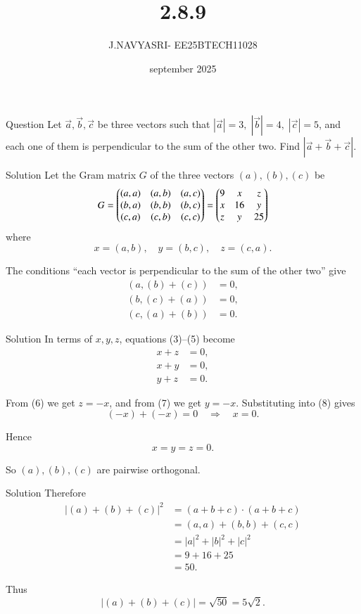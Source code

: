 \documentclass{beamer}
\title %
{2.8.9}
\date{september 2025}
\author %
{J.NAVYASRI- EE25BTECH11028}
\begin{document}
\frame{\titlepage}
\begin{frame}{Question}
Let $\vec{a}, \vec{b}, \vec{c}$ be three vectors such that 
$|\vec{a}|=3,\; |\vec{b}|=4,\; |\vec{c}|=5$, and each one of them is perpendicular to the sum of the other two. 
Find $|\vec{a}+\vec{b}+\vec{c}|$.
\end{frame}
\bigski
\begin{frame}{Solution}
Let the Gram matrix $G$ of the three vectors $(a), (b), (c)$ be
\begin{equation}
G = 
\begin{pmatrix}
(a,a) & (a,b) & (a,c) \\
(b,a) & (b,b) & (b,c) \\
(c,a) & (c,b) & (c,c)
\end{pmatrix}
=
\begin{pmatrix}
9 & x & z \\
x & 16 & y \\
z & y & 25
\end{pmatrix}
\end{equation}
where
\begin{equation}
x = (a,b), \quad y = (b,c), \quad z = (c,a).
\end{equation}

The conditions ``each vector is perpendicular to the sum of the other two'' give
\begin{align}
(a,(b)+(c)) &= 0, \\
(b,(c)+(a)) &= 0, \\
(c,(a)+(b)) &= 0.
\end{align}
\end{frame}

\begin{frame}{Solution}
In terms of $x,y,z$, equations (3)--(5) become
\begin{align}
x+z &= 0, \\
x+y &= 0, \\
y+z &= 0.
\end{align}

From (6) we get $z=-x$, and from (7) we get $y=-x$. Substituting into (8) gives
\begin{equation}
(-x)+(-x) = 0 \quad \Rightarrow \quad x=0.
\end{equation}

Hence
\begin{equation}
x=y=z=0.
\end{equation}

So $(a),(b),(c)$ are pairwise orthogonal.  
\end{frame}

\begin{frame}{Solution}
Therefore
\begin{align}
|(a)+(b)+(c)|^2 &= (a+b+c)\cdot(a+b+c) \\
&= (a,a) + (b,b) + (c,c) \\
&= |a|^2 + |b|^2 + |c|^2 \\
&= 9 + 16 + 25 \\
&= 50.
\end{align}

Thus
\begin{equation}
|(a)+(b)+(c)| = \sqrt{50} = 5\sqrt{2}.
\end{equation}
\end{frame}
\end{document}
